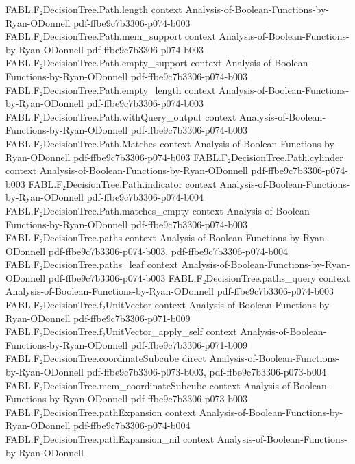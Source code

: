 \begin{theorem}
  {FABL.F₂DecisionTree.Path.length}
  {context}
  {Analysis-of-Boolean-Functions-by-Ryan-ODonnell}
  {pdf-ffbe9c7b3306-p074-b003}
\proofstep
  {FABL.F₂DecisionTree.Path.mem_support}
  {context}
  {Analysis-of-Boolean-Functions-by-Ryan-ODonnell}
  {pdf-ffbe9c7b3306-p074-b003}
\proofstep
  {FABL.F₂DecisionTree.Path.empty_support}
  {context}
  {Analysis-of-Boolean-Functions-by-Ryan-ODonnell}
  {pdf-ffbe9c7b3306-p074-b003}
\proofstep
  {FABL.F₂DecisionTree.Path.empty_length}
  {context}
  {Analysis-of-Boolean-Functions-by-Ryan-ODonnell}
  {pdf-ffbe9c7b3306-p074-b003}
\proofstep
  {FABL.F₂DecisionTree.Path.withQuery_output}
  {context}
  {Analysis-of-Boolean-Functions-by-Ryan-ODonnell}
  {pdf-ffbe9c7b3306-p074-b003}
\proofstep
  {FABL.F₂DecisionTree.Path.Matches}
  {context}
  {Analysis-of-Boolean-Functions-by-Ryan-ODonnell}
  {pdf-ffbe9c7b3306-p074-b003}
\proofstep
  {FABL.F₂DecisionTree.Path.cylinder}
  {context}
  {Analysis-of-Boolean-Functions-by-Ryan-ODonnell}
  {pdf-ffbe9c7b3306-p074-b003}
\proofstep
  {FABL.F₂DecisionTree.Path.indicator}
  {context}
  {Analysis-of-Boolean-Functions-by-Ryan-ODonnell}
  {pdf-ffbe9c7b3306-p074-b004}
\proofstep
  {FABL.F₂DecisionTree.Path.matches_empty}
  {context}
  {Analysis-of-Boolean-Functions-by-Ryan-ODonnell}
  {pdf-ffbe9c7b3306-p074-b003}
\proofstep
  {FABL.F₂DecisionTree.paths}
  {context}
  {Analysis-of-Boolean-Functions-by-Ryan-ODonnell}
  {pdf-ffbe9c7b3306-p074-b003,
    pdf-ffbe9c7b3306-p074-b004}
\proofstep
  {FABL.F₂DecisionTree.paths_leaf}
  {context}
  {Analysis-of-Boolean-Functions-by-Ryan-ODonnell}
  {pdf-ffbe9c7b3306-p074-b003}
\proofstep
  {FABL.F₂DecisionTree.paths_query}
  {context}
  {Analysis-of-Boolean-Functions-by-Ryan-ODonnell}
  {pdf-ffbe9c7b3306-p074-b003}
\proofstep
  {FABL.F₂DecisionTree.f₂UnitVector}
  {context}
  {Analysis-of-Boolean-Functions-by-Ryan-ODonnell}
  {pdf-ffbe9c7b3306-p071-b009}
\proofstep
  {FABL.F₂DecisionTree.f₂UnitVector_apply_self}
  {context}
  {Analysis-of-Boolean-Functions-by-Ryan-ODonnell}
  {pdf-ffbe9c7b3306-p071-b009}
\proofstep
  {FABL.F₂DecisionTree.coordinateSubcube}
  {direct}
  {Analysis-of-Boolean-Functions-by-Ryan-ODonnell}
  {pdf-ffbe9c7b3306-p073-b003,
    pdf-ffbe9c7b3306-p073-b004}
\proofstep
  {FABL.F₂DecisionTree.mem_coordinateSubcube}
  {context}
  {Analysis-of-Boolean-Functions-by-Ryan-ODonnell}
  {pdf-ffbe9c7b3306-p073-b003}
\proofstep
  {FABL.F₂DecisionTree.pathExpansion}
  {context}
  {Analysis-of-Boolean-Functions-by-Ryan-ODonnell}
  {pdf-ffbe9c7b3306-p074-b004}
\proofstep
  {FABL.F₂DecisionTree.pathExpansion_nil}
  {context}
  {Analysis-of-Boolean-Functions-by-Ryan-ODonnell}

\end{theorem}
